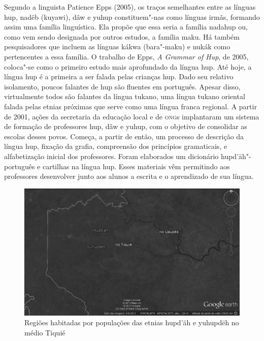 Segundo a linguista Patience Epps (2005), os traços semelhantes entre as
línguas hup, nadëb (kuyawi), dâw e yuhup constituem"-nas como línguas
irmãs, formando assim uma família linguística. Ela propõe que essa seria
a família nadahup ou, como vem sendo designada por outros estudos, a
família maku. Há também pesquisadores que incluem as línguas kákwa
(bara"-maku) e nukák como pertencentes a essa família. O trabalho de
Epps, \emph{A Grammar of Hup}, de 2005, coloca"-se como o primeiro estudo
mais aprofundado da língua hup. Até hoje, a língua hup é a primeira a
ser falada pelas crianças hup. Dado seu relativo isolamento, poucos
falantes de hup são fluentes em português. Apesar disso, virtualmente
todos são falantes da língua tukano, uma língua tukano oriental falada
pelas etnias próximas que serve como uma língua franca regional. A
partir de 2001, ações da secretaria da educação local e de \textsc{ong}s
implantaram um sistema de formação de professores hup, dâw e yuhup, com
o objetivo de consolidar as escolas desses povos. Começa, a partir de
então, um processo de descrição da língua hup, fixação da grafia,
compreensão dos princípios gramaticais, e alfabetização inicial dos
professores. Foram elaborados um dicionário hupd'äh"-português e
cartilhas na língua hup. Esses materiais vêm permitindo aos professores
desenvolver junto aos alunos a escrita e o aprendizado de sua língua.

\begin{figure}
\centering
\includegraphics[width=\textwidth]{./img/004}
\caption{Regiões habitadas por populações das etnias hupd'äh
e yuhupdëh no médio Tiquié}
\end{figure}

